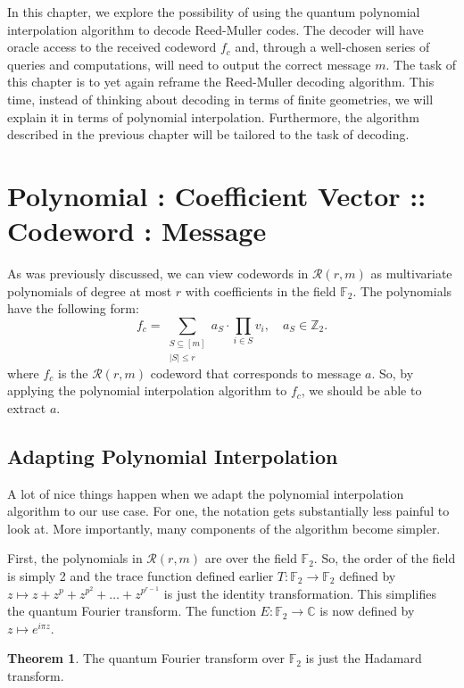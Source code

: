 \documentclass[12pt,twoside]{reedthesis}
\theoremstyle{definition}
\newtheorem{theorem}{Theorem}[chapter]
\newlength{\arrow}
\newcommand{\Z}{\mathbb{Z}}
\newcommand{\C}{\mathbb{C}}
\newcommand{\F}{\mathbb{F}}
\begin{document}
In this chapter, we explore the possibility of using the quantum polynomial interpolation algorithm to decode Reed-Muller codes. The decoder will have oracle access to the received codeword $f_c$ and, through a well-chosen series of queries and computations, will need to output the correct message $m$. The task of this chapter is to yet again reframe the Reed-Muller decoding algorithm. This time, instead of thinking about decoding in terms of finite geometries, we will explain it in terms of polynomial interpolation. Furthermore, the algorithm described in the previous chapter will be tailored to the task of decoding.
 
\section{Polynomial : Coefficient Vector :: Codeword : Message}
As was previously discussed, we can view codewords in $\mathscr{R}(r,m)$ as multivariate polynomials of degree at most $r$ with coefficients in the field $\F_2$. The polynomials have the following form:
\begin{equation*}
f_c = \sum_{\substack{S \subseteq [m] \\ \lvert S \rvert \leq r}} a_S \cdot \prod_{i \in S} v_i,  \quad a_S \in \Z_2.
\end{equation*}
where $f_c$ is the $\mathscr{R}(r,m)$ codeword that corresponds to message $a$. So, by applying the polynomial interpolation algorithm to $f_c$, we should be able to extract $a$. 


\subsection{Adapting Polynomial Interpolation}
A lot of nice things happen when we adapt the polynomial interpolation algorithm to our use case. For one, the notation gets substantially less painful to look at. More importantly, many components of the algorithm become simpler.

First, the polynomials in $\mathscr{R}(r,m)$ are over the field $\F_2$. So, the order of the field is simply 2 and the trace function defined earlier $T:\F_2 \rightarrow \F_2$ defined by $z \mapsto z + z^p + z^{p^2} + \ldots + z^{p^{r-1}}$ is just the identity transformation. This simplifies the quantum Fourier transform. The function $E: \F_2 \rightarrow \C$ is now defined by $z \longmapsto e^{i\pi z}$.

 
\begin{theorem} The quantum Fourier transform over $\F_2$ is just the Hadamard transform.
\end{theorem}
\end{document}
